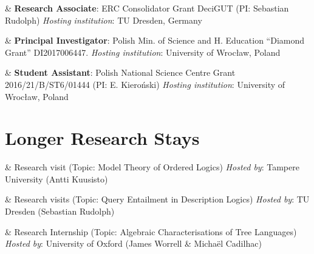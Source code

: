 \documentclass[10pt,a4paper]{article}
\begin{document}
\begin{EntriesTableDuration}
    & 
  \textbf{Research Associate}: ERC Consolidator Grant DeciGUT (PI: Sebastian Rudolph)\newline
  \emph{Hosting institution}: TU Dresden, Germany
\end{EntriesTableDuration}

\begin{EntriesTableDuration}
    & 
  \textbf{Principal Investigator}: Polish Min. of Science and H. Education ``Diamond Grant''  DI2017006447.\newline
  \emph{Hosting institution}: University of Wrocław, Poland
\end{EntriesTableDuration}

\begin{EntriesTableDuration}
    & 
  \textbf{Student Assistant}: Polish National Science Centre Grant 2016/21/B/ST6/01444 (PI: E. Kieroński)\newline
  \emph{Hosting institution}: University of Wrocław, Poland
\end{EntriesTableDuration}


\section{Longer Research Stays}

\begin{EntriesTableYear}
    & 
  Research visit (Topic: Model Theory of Ordered Logics)\newline
  \emph{Hosted by}: Tampere University (Antti Kuusisto)
\end{EntriesTableYear}

\begin{EntriesTableYear}
    & 
  Research visits (Topic: Query Entailment in Description Logics)\newline
  \emph{Hosted by}: TU Dresden (Sebastian Rudolph)
\end{EntriesTableYear}

\begin{EntriesTableYear}
    & 
  Research Internship (Topic: Algebraic Characterisations of Tree Languages)\newline
  \emph{Hosted by}: University of Oxford (James Worrell \& Michaël Cadilhac)
\end{EntriesTableYear}
\end{document}
